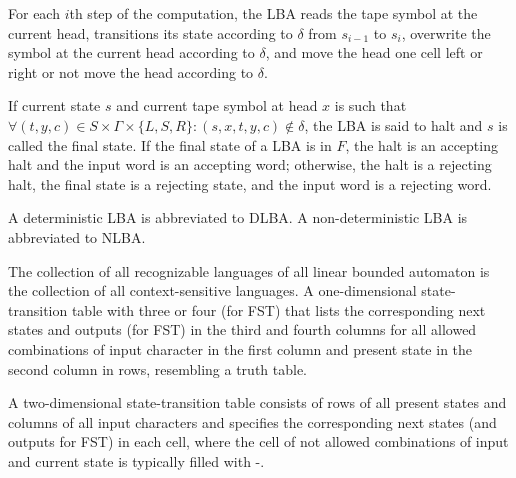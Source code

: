 \documentclass[a4paper,12pt]{article}
\begin{document}
For each $i$th step of the computation, the LBA reads the tape symbol at the current head, transitions its state according to $\delta$ from $s_{i-1}$ to $s_i$, overwrite the symbol at the current head according to $\delta$, and move the head one cell left or right or not move the head according to $\delta$.

If current state $s$ and current tape symbol at head $x$ is such that $\forall (t,y,c)\in S\times\Gamma\times\{L,S,R\}\colon(s,x,t,y,c)\notin\delta$, the LBA is said to halt and $s$ is called the final state. If the final state of a LBA is in $F$, the halt is an accepting halt and the input word is an accepting word; otherwise, the halt is a rejecting halt, the final state is a rejecting state, and the input word is a rejecting word.

A deterministic LBA is abbreviated to DLBA. A non-deterministic LBA is abbreviated to NLBA.

 The collection of all recognizable languages of all linear bounded automaton is the collection of all context-sensitive languages.
A one-dimensional state-transition table with three or four (for FST) that lists the corresponding next states and outputs (for FST) in the third and fourth columns for all allowed combinations of input character in the first column and present state in the second column in rows, resembling a truth table.

A two-dimensional state-transition table consists of rows of all present states and columns of all input characters and specifies the corresponding next states (and outputs for FST) in each cell, where the cell of not allowed combinations of input and current state is typically filled with -.
\end{document}
